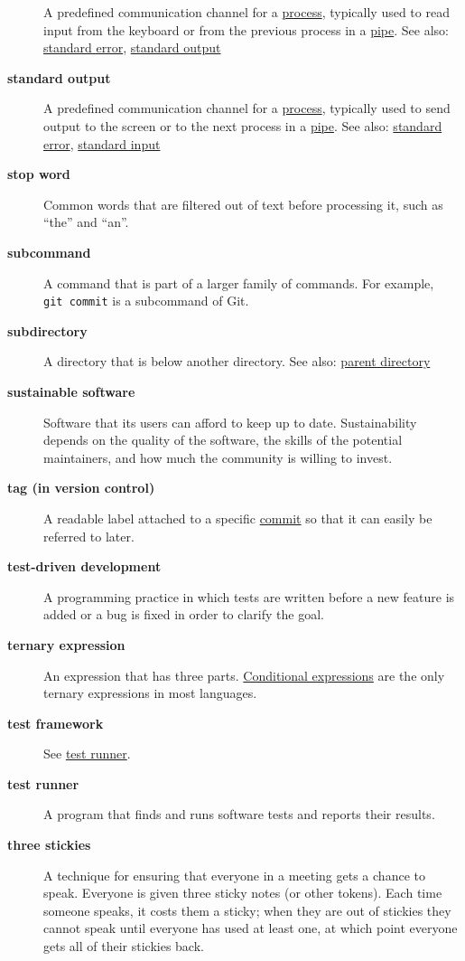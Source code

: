 \documentclass[
]{krantz}
\begin{document}
\begin{description}
A predefined communication channel for a \protect\hyperlink{process}{process}, typically used to read input from the keyboard or from the previous process in a \protect\hyperlink{pipe_shell}{pipe}. See also: \protect\hyperlink{stderr}{standard error}, \protect\hyperlink{stdout}{standard output}
\item[\textbf{standard output}]
A predefined communication channel for a \protect\hyperlink{process}{process}, typically used to send output to the screen or to the next process in a \protect\hyperlink{pipe_shell}{pipe}. See also: \protect\hyperlink{stderr}{standard error}, \protect\hyperlink{stdin}{standard input}
\item[\textbf{stop word}]
Common words that are filtered out of text before processing it, such as ``the'' and ``an''.
\item[\textbf{subcommand}]
A command that is part of a larger family of commands. For example, \texttt{git\ commit} is a subcommand of Git.
\item[\textbf{subdirectory}]
A directory that is below another directory. See also: \protect\hyperlink{parent_directory}{parent directory}
\item[\textbf{sustainable software}]
Software that its users can afford to keep up to date. Sustainability depends on the quality of the software, the skills of the potential maintainers, and how much the community is willing to invest.
\item[\textbf{tag (in version control)}]
A readable label attached to a specific \protect\hyperlink{commit}{commit} so that it can easily be referred to later.
\item[\textbf{test-driven development}]
A programming practice in which tests are written before a new feature is added or a bug is fixed in order to clarify the goal.
\item[\textbf{ternary expression}]
An expression that has three parts. \protect\hyperlink{conditional_expression}{Conditional expressions} are the only ternary expressions in most languages.
\item[\textbf{test framework}]
See \protect\hyperlink{test_runner}{test runner}.
\item[\textbf{test runner}]
A program that finds and runs software tests and reports their results.
\item[\textbf{three stickies}]
A technique for ensuring that everyone in a meeting gets a chance to speak. Everyone is given three sticky notes (or other tokens). Each time someone speaks, it costs them a sticky; when they are out of stickies they cannot speak until everyone has used at least one, at which point everyone gets all of their stickies back.

\end{description}
\end{document}
